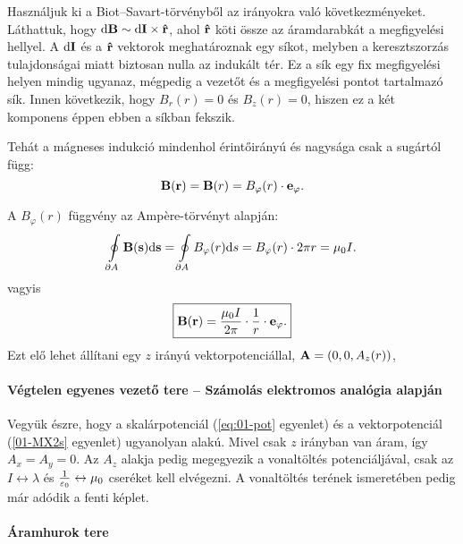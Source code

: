     Használjuk ki a Biot--Savart-törvényből az irányokra való következményeket. Láthattuk, hogy $\mathrm{d} \mathbf{B}\sim \mathrm{d} \mathbf{I}\times \mathbf{\hat{r}}$, ahol $\mathbf{\hat{r}}$ köti össze az áramdarabkát a megfigyelési hellyel. A  $\mathrm{d} \mathbf{I}$ és a $\mathbf{\hat{r}}$ vektorok meghatároznak egy síkot, melyben a keresztszorzás tulajdonságai miatt biztosan nulla az indukált tér. Ez a sík egy fix megfigyelési helyen mindig ugyanaz, mégpedig a vezetőt és a megfigyelési pontot tartalmazó sík. Innen következik, hogy $B_r(r)=0$ és $B_z(r)=0$, hiszen ez a két komponens éppen ebben a síkban fekszik. 
    
    Tehát a mágneses indukció mindenhol érintőirányú és nagysága csak a sugártól függ:
    \[
     \mathbf{B}(\mathbf{r})=\mathbf{B}(r)=B_\varphi(r)\cdot\mathbf{e}_\varphi.
    \]
    
    A $B_\varphi(r)$ függvény az Amp\`ere-törvényt alapján: 
    \[
     \oint\limits_{\partial A}\mathbf{B}(\mathbf{s})\mathrm{d} \mathbf{s}=\oint\limits_{\partial A}B_\varphi(r)\mathrm{d} s=B_\varphi(r)\cdot 2\pi r=\mu_0 I.
    \]
    vagyis 
    \[
     \boxed{\mathbf{B}(\mathbf{r})=\frac{\mu_0 I}{2\pi}\cdot\frac{1}{r}\cdot\mathbf{e}_\varphi.}
    \]
    Ezt elő lehet állítani egy $z$ irányú vektorpotenciállal, $\mathbf{A}=(0,0,A_z(r))$,
    
   \paragraph{Végtelen egyenes vezető tere -- Számolás elektromos analógia alapján}
    
    Vegyük észre, hogy a skalárpotenciál (\eqref{eq:01-pot} egyenlet) és a vektorpotenciál (\eqref{01-MX2s} egyenlet) ugyanolyan alakú. Mivel csak $z$ irányban van áram, így $A_x=A_y=0$. Az $A_z$ alakja pedig megegyezik a vonaltöltés potenciáljával, csak az $I\leftrightarrow \lambda$ és $\frac{1}{\varepsilon_0}\leftrightarrow\mu_0$ cseréket kell elvégezni. A vonaltöltés terének ismeretében pedig már adódik a fenti képlet.
    
   \paragraph{Áramhurok tere}
    
